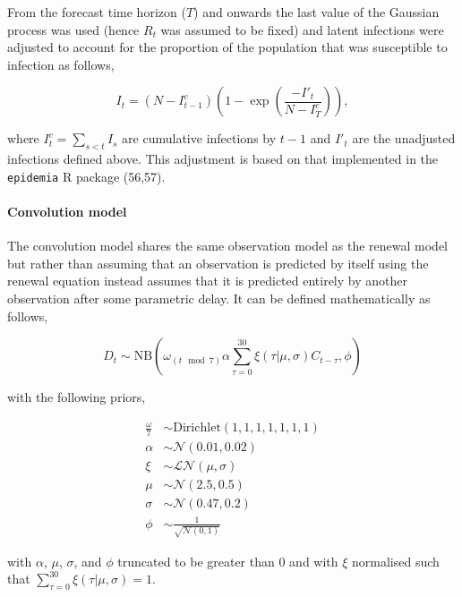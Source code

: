 \documentclass[
]{article}
\begin{document}
From the forecast time horizon (\(T\)) and onwards the last value of the Gaussian process was used (hence \(R_t\) was assumed to be fixed) and latent infections were adjusted to account for the proportion of the population that was susceptible to infection as follows,

\begin{equation}
    I_t = (N - I^c_{t-1}) \left(1 - \exp \left(\frac{-I'_t}{N - I^c_{T}}\right)\right),
\end{equation}

where \(I^c_t = \sum_{s< t} I_s\) are cumulative infections by \(t-1\) and \(I'_t\) are the unadjusted infections defined above. This adjustment is based on that implemented in the \texttt{epidemia} R package (56,57).

\hypertarget{convolution-model}{%
\paragraph{Convolution model}\label{convolution-model}}

The convolution model shares the same observation model as the renewal model but rather than assuming that an observation is predicted by itself using the renewal equation instead assumes that it is predicted entirely by another observation after some parametric delay. It can be defined mathematically as follows,

\begin{equation} 
    D_{t} \sim \mathrm{NB}\left(\omega_{(t \mod 7)} \alpha \sum_{\tau = 0}^{30} \xi(\tau | \mu, \sigma) C_{t-\tau},  \phi \right)
\end{equation}

with the following priors,

\begin{align}
    \frac{\omega}{7} &\sim \mathrm{Dirichlet}(1, 1, 1, 1, 1, 1, 1) \\
    \alpha &\sim \mathcal{N}(0.01, 0.02) \\
    \xi &\sim \mathcal{LN}(\mu, \sigma) \\
    \mu &\sim \mathcal{N}(2.5, 0.5) \\
\sigma &\sim \mathcal{N}(0.47, 0.2) \\
\phi &\sim \frac{1}{\sqrt{\mathcal{N}(0, 1)}}
\end{align}

with \(\alpha\), \(\mu\), \(\sigma\), and \(\phi\) truncated to be greater than 0 and with \(\xi\) normalised such that \(\sum_{\tau = 0}^{30} \xi(\tau | \mu, \sigma) = 1\).
\end{document}
